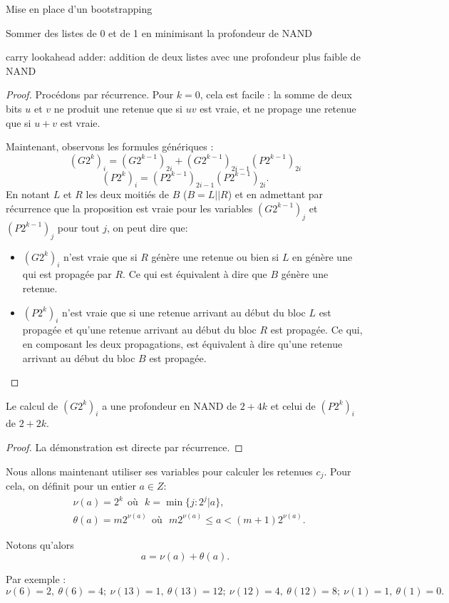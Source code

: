 \begin{section}{Mise en place d'un bootstrapping}
\begin{subsection}{Sommer des listes de 0 et de 1 en minimisant la profondeur de NAND}
\begin{subsubsection}{carry lookahead adder: addition de deux listes avec une profondeur plus faible de NAND}
\begin{proof}
	Procédons par récurrence. Pour $k = 0$, cela est facile : la somme de deux bits $u$ et $v$ ne produit une retenue que si $uv$ est vraie, et ne propage une retenue que si $u+v$ est vraie.

	Maintenant, observons les formules génériques :
\[{(G2^k)_i} = {(G2^{k-1})_{2i}} + {(G2^{k-1})_{2i-1}}{(P2^{k-1})_{2i}}\]
\[{(P2^{k})_i} = {(P2^{k-1})_{2i-1}} {(P2^{k-1})_{2i}}. \]
En notant $L$ et $R$ les deux moitiés de $B$ ($B = L||R$) et en admettant par récurrence 
que la proposition est vraie pour les variables ${(G2^{k-1})}_j$ et ${(P2^{k-1})}_j$ pour tout $j$, on peut dire que:
\begin{itemize}
\item $(G2^k)_i$ n'est vraie que si $R$ génère une retenue ou bien si $L$ en génère une qui est propagée par $R$. Ce qui est équivalent à dire que $B$ génère une retenue.
\item $(P2^{k})_i$ n'est vraie que si une retenue arrivant au début du bloc $L$ est propagée et qu'une retenue arrivant au début du bloc $R$ est propagée. Ce qui, en composant les deux propagations, est équivalent à dire qu'une retenue arrivant au début du bloc $B$ est propagée.  
\end{itemize}
\end{proof}

\begin{prop} \label{g_et_p}
Le calcul de $(G2^k)_i$ a une profondeur en NAND de $2 + 4k$ et celui de $(P2^k)_i$ de $2 + 2k$.
\end{prop}

\begin{proof}
	La démonstration est directe par récurrence. 
\end{proof}

Nous allons maintenant utiliser ses variables pour calculer les retenues $c_j$.
Pour cela, on définit pour un entier $a \in Z$:
\begin{align*}
	&\nu(a) = 2^k\:\: \text{où} \:\:\: k = \min\{j: 2^j | a\}, \\
	&\theta(a) = m 2^{\nu(a)}\:\: \text{où}\:\:\: m 2^{\nu(a)} \leqslant a < (m+1) 2^{\nu(a)}.
\end{align*}

	Notons qu'alors \[a = \nu(a) + \theta(a).\]
	
	Par exemple :
\[\nu(6) = 2,\ \theta(6) = 4;\ \nu(13) = 1,\ \theta(13) = 12;\ \nu(12)= 4,\ \theta(12) = 8;\ \nu(1) = 1,\ \theta(1) = 0.\]

\paragraph{}


\end{subsubsection}
\end{subsection}
\end{section}
